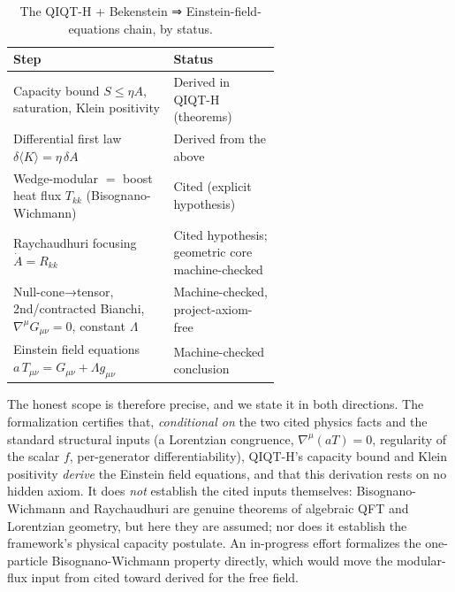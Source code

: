 \documentclass[11pt]{article}
\begin{document}
\begin{table}[ht]
\centering
\caption{The QIQT-H + Bekenstein ⇒ Einstein-field-equations chain, by status.}
\begin{tabularx}{\linewidth}{@{}>{\raggedright\arraybackslash}p{0.60\linewidth}Y@{}}
\toprule
\textbf{Step} & \textbf{Status} \\
\midrule
Capacity bound $S\le\eta A$, saturation, Klein positivity & Derived in QIQT-H (theorems) \\
Differential first law $\delta\langle K\rangle=\eta\,\delta A$ & Derived from the above \\
Wedge-modular $=$ boost heat flux $T_{kk}$ (Bisognano-Wichmann) & Cited (explicit hypothesis) \\
Raychaudhuri focusing $\dot{A}=R_{kk}$ & Cited hypothesis; geometric core machine-checked \\
Null-cone→tensor, 2nd/contracted Bianchi, $\nabla^\mu G_{\mu\nu}=0$, constant $\Lambda$ & Machine-checked, project-axiom-free \\
Einstein field equations $a\,T_{\mu\nu}=G_{\mu\nu}+\Lambda g_{\mu\nu}$ & Machine-checked conclusion \\
\bottomrule
\end{tabularx}
\end{table}

The honest scope is therefore precise, and we state it in both directions. The formalization certifies
that, \emph{conditional on} the two cited physics facts and the standard structural inputs (a
Lorentzian congruence, $\nabla^\mu(aT)=0$, regularity of the scalar $f$, per-generator
differentiability), QIQT-H's capacity bound and Klein positivity \emph{derive} the Einstein field
equations, and that this derivation rests on no hidden axiom. It does \emph{not} establish the cited
inputs themselves: Bisognano-Wichmann and Raychaudhuri are genuine theorems of algebraic QFT and
Lorentzian geometry, but here they are assumed; nor does it establish the framework's physical
capacity postulate. An in-progress effort formalizes the one-particle Bisognano-Wichmann property
directly, which would move the modular-flux input from cited toward derived for the free field.
\end{document}
